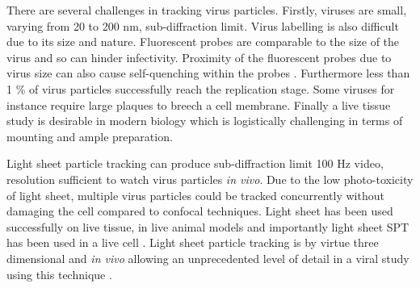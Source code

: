 There are several challenges in tracking virus particles. Firstly, viruses are small, varying from 20 to 200 nm, sub-diffraction limit. %
Virus labelling is also difficult due to its size and nature. Fluorescent probes are comparable to the size of the virus and so can hinder infectivity. Proximity of the fluorescent probes due to virus size can also cause self-quenching within the probes \cite{Seisenberger2001}. Furthermore less than 1 \% of virus particles successfully reach the replication stage. Some viruses for instance require large plaques to breech a cell membrane. Finally a live tissue study is desirable in modern biology \cite{Brandenburg2007} which is logistically challenging in terms of mounting and ample preparation.

Light sheet particle tracking can produce sub-diffraction limit 100 Hz video, resolution sufficient to watch virus particles \textit{in vivo}. Due to the low photo-toxicity of light sheet, multiple virus particles could be tracked concurrently without damaging the cell compared to confocal techniques. Light sheet has been used successfully on live tissue, in live animal models \cite{Keller2008} and importantly light sheet SPT has been used in a live cell \cite{Spille2013}. Light sheet particle tracking is by virtue three dimensional and \textit{in vivo} allowing an unprecedented level of detail in a viral study using this technique \cite{Hoffman2005}.

